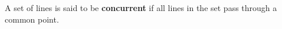 A set of lines is said to be \textbf{concurrent} if all lines in the set pass through a common point.
